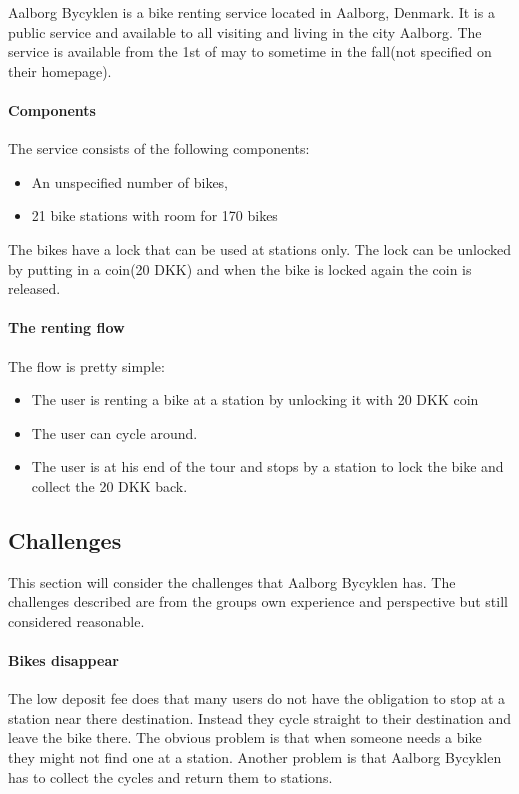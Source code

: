 
Aalborg Bycyklen is a bike renting service located in Aalborg, Denmark.
It is a public service and available to all visiting and living in the city Aalborg.
The service is available from the 1st of may to sometime in the fall(not specified on their homepage).
\cite{aalborgbycyklenbagcyklen}

\paragraph{Components}
The service consists of the following components:
\begin{itemize}
\item An unspecified number of bikes, 
\item 21 bike stations with room for 170 bikes
\end{itemize}
The bikes have a lock that can be used at stations only.
The lock can be unlocked by putting in a coin(20 DKK) and when the bike is locked again the coin is released.

\paragraph{The renting flow}
The flow is pretty simple:
\begin{itemize}
\item The user is renting a bike at a station by unlocking it with 20 DKK coin
\item The user can cycle around.
\item The user is at his end of the tour and stops by a station to lock the bike and collect the 20 DKK back.
\end{itemize}

\subsection{Challenges}
This section will consider the challenges that Aalborg Bycyklen has.
The challenges described are from the groups own experience and perspective but still considered reasonable.

\paragraph{Bikes disappear}
The low deposit fee does that many users do not have the obligation to stop at a station near there destination.
Instead they cycle straight to their destination and leave the bike there.
The obvious problem is that when someone needs a bike they might not find one at a station.
Another problem is that Aalborg Bycyklen has to collect the cycles and return them to stations.

